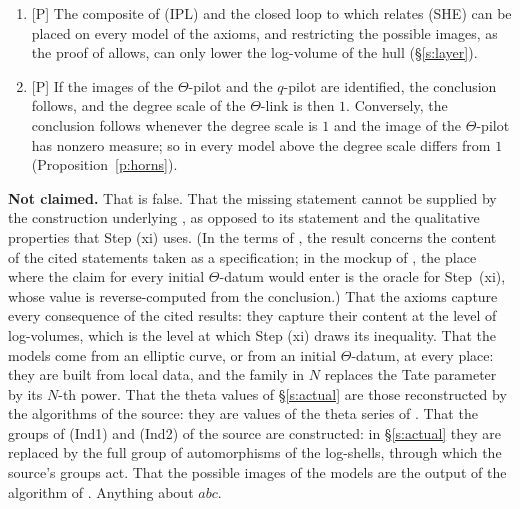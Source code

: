\documentclass[11pt]{article}
\theoremstyle{plain}
\theoremstyle{definition}
\theoremstyle{remark}
\newcommand{\Pmark}{\textup{[P]}}
\begin{document}
\begin{enumerate}[label=(\roman*),leftmargin=2.2em]
  series, a container that is a multiple of the
  log-shell packet, and the hull of \cite[Rem.~3.9.5(i)]{IUT3}; the
  enlargement of the hull over the image of the $\Theta$-pilot is bounded by a constant
  that depends only on $L$ (Theorem~\ref{t:actual}). An example is given with ramification
  index divisible by $98$.
\item \Pmark{} The composite of (IPL) and the closed loop to which
  \cite[Rem.~3.11.1(iii)]{IUT3} relates (SHE) can be placed on every model of the axioms,
  and restricting the possible images, as the proof of \cite[Cor.~3.12]{IUT3} allows, can
  only lower the log-volume of the hull (\S\ref{s:layer}).
\item \Pmark{} If the images of the $\Theta$-pilot and the $q$-pilot are identified, the
  conclusion follows, and the degree scale of the $\Theta$-link is then $1$. Conversely,
  the conclusion follows whenever the degree scale is $1$ and the image of the
  $\Theta$-pilot has nonzero measure; so in every model above the degree scale differs
  from $1$ (Proposition~\ref{p:horns}).
\end{enumerate}

\smallskip\noindent\textbf{Not claimed.} That \cite[Cor.~3.12]{IUT3} is false. That the
missing statement cannot be supplied by the construction underlying
\cite[Thm.~3.11]{IUT3}, as opposed to its statement and the qualitative properties that
Step (xi) uses. (In the terms of \cite[\S6.3]{TC}, the result concerns the content of the
cited statements taken as a specification; in the mockup of \cite[\S9]{TC}, the place where
the claim for every initial $\Theta$-datum would enter is the oracle for Step~(xi), whose
value is reverse-computed from the conclusion.) That the axioms capture every consequence of the cited results: they
capture their content at the level of log-volumes, which is the level at which Step (xi)
draws its inequality. That the models come from an elliptic curve, or from an initial
$\Theta$-datum, at every place: they are built from local data, and the family in $N$
replaces the Tate parameter by its $N$-th power. That the theta values of \S\ref{s:actual}
are those reconstructed by the algorithms of the source: they are values of the theta
series of \cite[Prop.~1.4]{EtTh}. That the groups of (Ind1) and (Ind2) of the source
are constructed: in \S\ref{s:actual} they are replaced by the full group of automorphisms
of the log-shells, through which the source's groups act. That the possible images of the
models are the output of the algorithm of \cite[Thm.~3.11]{IUT3}. Anything about $abc$.
\end{document}
